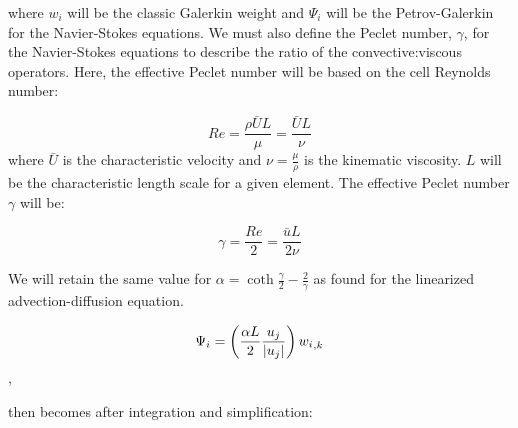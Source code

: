 where $w_i$ will be the classic Galerkin weight and $\Psi_i$ will be the
Petrov-Galerkin for the Navier-Stokes equations. We must also define the
Peclet number, $\gamma$, for the Navier-Stokes equations to describe the ratio
of the convective:viscous operators. Here, the effective Peclet number will be
based on the cell Reynolds number:

\begin{equation}
  Re = \frac{\rho\bar{U}L}{\mu}  =\frac{\bar{U}L}{\nu}
\end{equation}
where $\bar{U}$ is the characteristic velocity and $\nu=\frac{\mu}{\rho}$ is
the kinematic viscosity. $L$ will be the characteristic length scale for a
given element. The effective Peclet number $\gamma$ will be:

\begin{equation}
  \gamma= \frac{Re}{2}  = \frac{\bar{u}L}{2\nu}
\end{equation}

We will retain the same value for
$\alpha={\coth{\frac{\gamma}{2}} - \frac{2}{\gamma}}$ as found for the
linearized advection-diffusion equation.

\begin{equation}
 \label{PGTest}
  \Psi_i = \pbrac{\frac{\alpha{L}}{2}{\frac{u_j}{\abs{u_j}}}}{\partialderiv{w_{i}}{k}}
\end{equation},

 then becomes after integration and simplification:

